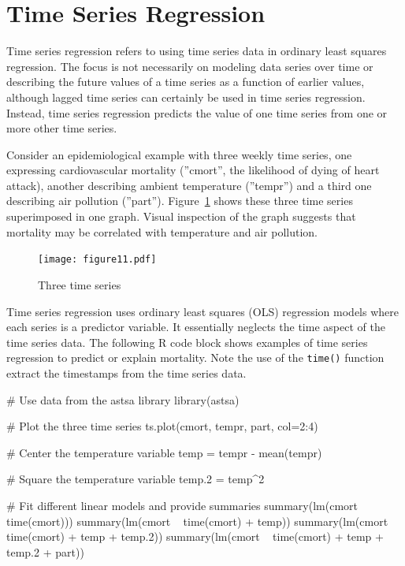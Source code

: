 \section{Time Series Regression}

Time series regression refers to using time series data in ordinary least squares regression. The focus is not necessarily on modeling data series over time or describing the future values of a time series as a function of earlier values, although lagged time series can certainly be used in time series regression. Instead, time series regression predicts the value of one time series from one or more other time series. 

Consider an epidemiological example with three weekly time series, one expressing cardiovascular mortality (''cmort'', the likelihood of dying of heart attack), another describing ambient temperature (''tempr'') and a third one describing air pollution (''part''). Figure~\ref{fig:figure11} shows these three time series superimposed in one graph. Visual inspection of the graph suggests that mortality may be correlated with temperature and air pollution.

\begin{figure}
\centering
\texttt{[image: figure11.pdf]}
\caption{Three time series}
\label{fig:figure11}
\end{figure}

Time series regression uses ordinary least squares (OLS) regression models where each series is a predictor variable. It essentially neglects the time aspect of the time series data. The following R code block shows examples of time series regression to predict or explain mortality. Note the use of the \texttt{time()} function extract the timestamps from the time series data.

\begin{Rcode}
# Use data from the astsa library
library(astsa)

# Plot the three time series
ts.plot(cmort, tempr, part, col=2:4)

# Center the temperature variable
temp = tempr - mean(tempr)

# Square the temperature variable
temp.2 = temp^2

# Fit different linear models and provide summaries
summary(lm(cmort ~ time(cmort)))
summary(lm(cmort ~ time(cmort) + temp))
summary(lm(cmort ~ time(cmort) + temp + temp.2))
summary(lm(cmort ~ time(cmort) + temp + temp.2 + part))
\end{Rcode}

